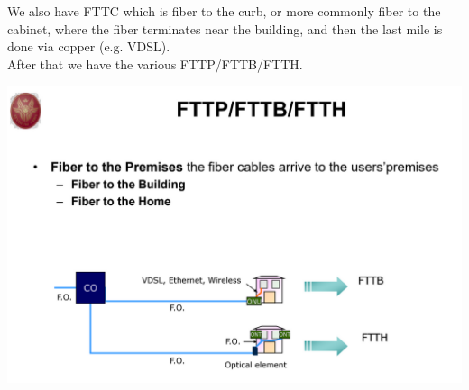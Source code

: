 \documentclass[11pt, a4paper]{article}
\begin{document}
We also have FTTC which is fiber to the curb, or more commonly fiber to the cabinet, where the fiber terminates near the building, and then the last mile is done via copper (e.g. VDSL).\\
After that we have the various FTTP/FTTB/FTTH.
\begin{center}
    \includegraphics[scale=0.5]{img/AccessNetworks/FTTX/FTTP.png}
\end{center}
\end{document}
